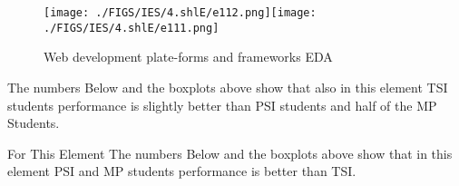\documentclass[12pt]{extreport}
\begin{document}
\begin{figure}[H]
	\centering
	\texttt{[image: ./FIGS/IES/4.shlE/e112.png]}\texttt{[image: ./FIGS/IES/4.shlE/e111.png]}
	\caption{Web development plate-forms and frameworks EDA}
	\label{fig:54}
\end{figure}

The numbers Below and the boxplots above show that also in this element  TSI students performance is slightly better than PSI students and half of the MP Students.

For This Element The numbers Below and the boxplots above show that in this element  PSI and MP students performance is  better than TSI.


\begin{comment}
\subparagraph{Interpretation of the Box-plots:}
For This Element 

\begin{enumerate}	
	\item The MP Class Box-Plot:
	\begin{enumerate}
		\item MAX = a {} {} {} {} {} {} {} {} UQ = b {} {} {} {} {} {} {} {} Median = c
		\item LQ = d {} {} {} {} {} {} {} {}  MIN =	l {} {} {} {} {} {} {} {}  IQR = e - f = g
	\end{enumerate}
	\item The PSI Class Box-Plot:
	\begin{enumerate}
		\item MAX = a {} {} {} {} {} {} {} {} UQ = b {} {} {} {} {} {} {} {} Median = c
		\item LQ = d {} {} {} {} {} {} {} {}  MIN =	e {} {} {} {} {} {} {} {} IQR = f - g = h	
	\end{enumerate}
	\item The TSI Class Box-Plot:
	\begin{enumerate}
		\item MAX = a {} {} {} {} {} {} {} {} UQ = b {} {} {} {} {} {} {} {} Median = c
		\item LQ = d {} {} {} {} {} {} {} {} MIN = e {} {} {} {} {} {} {} {} IQR = f - g = h	
	\end{enumerate}
\end{enumerate}

\subparagraph{Interpretation of the histogram:}
This Frequency Distribution is (Skeness) with the following descriptive statistics:
\begin{enumerate}
	\item Mean = 
	\item STD = 
	\item Range = a - b = c
	\item IQR = a-b = c 
\end{enumerate}
\end{comment}
\end{document}
